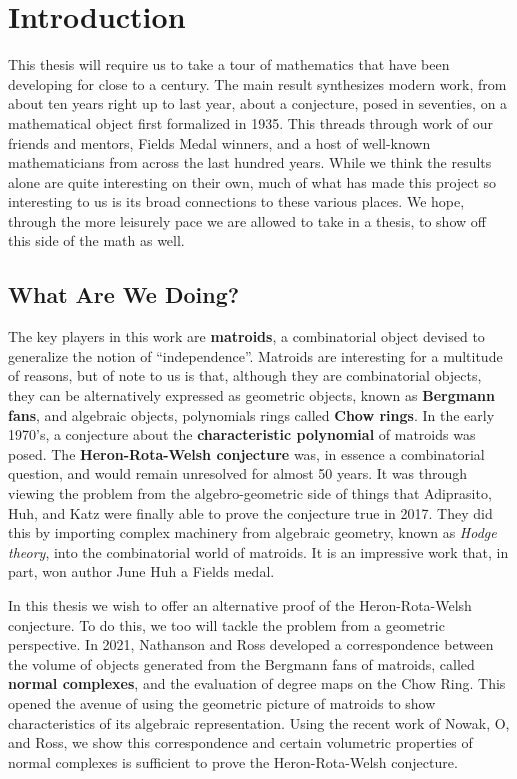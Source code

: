 \documentclass[12pt,oneside]{../../sfsuthesis}
\begin{document}
\chapter{Introduction}


This thesis will require us to take a tour of mathematics that have been developing for close to a century.
The main result synthesizes modern work, from about ten years right up to last year, about a conjecture, posed in seventies, on a mathematical object first formalized in 1935.
This threads through work of our friends and mentors, Fields Medal winners, and a host of well-known mathematicians from across the last hundred years.
While we think the results alone are quite interesting on their own, much of what has made this project so interesting to us is its broad connections to these various places.
We hope, through the more leisurely pace we are allowed to take in a thesis, to show off this side of the math as well.

\section{What Are We Doing?}

The key players in this work are \textbf{matroids}, a combinatorial object devised to generalize the notion of ``independence''.
Matroids are interesting for a multitude of reasons, but of note to us is that, although they are combinatorial objects, they can be alternatively expressed as geometric objects, known as \textbf{Bergmann fans}, and algebraic objects, polynomials rings called \textbf{Chow rings}.
In the early 1970's, a conjecture about the \textbf{characteristic polynomial} of matroids was posed.
The \textbf{Heron-Rota-Welsh conjecture} was, in essence a combinatorial question, and would remain unresolved for almost 50 years.
It was through viewing the problem from the algebro-geometric side of things that Adiprasito, Huh, and Katz were finally able to prove the conjecture true in 2017.
They did this by importing complex machinery from algebraic geometry, known as \emph{Hodge theory}, into the combinatorial world of matroids.
It is an impressive work that, in part, won author June Huh a Fields medal.

In this thesis we wish to offer an alternative proof of the Heron-Rota-Welsh conjecture.
To do this, we too will tackle the problem from a geometric perspective.
In 2021, Nathanson and Ross developed a correspondence between the volume of objects generated from the Bergmann fans of matroids, called \textbf{normal complexes}, and the evaluation of degree maps on the Chow Ring.
This opened the avenue of using the geometric picture of matroids to show characteristics of its algebraic representation.
Using the recent work of Nowak, O, and Ross, we show this correspondence and certain volumetric properties of normal complexes is sufficient to prove the Heron-Rota-Welsh conjecture.
\end{document}
